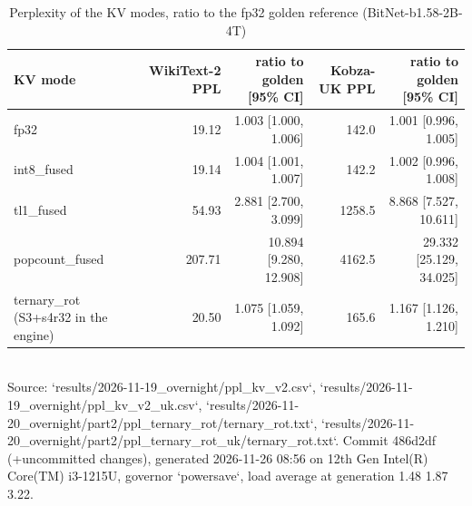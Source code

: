 \begin{table}[t]\centering\small
\caption{Perplexity of the KV modes, ratio to the fp32 golden reference (BitNet-b1.58-2B-4T)}
\begin{tabular}{lrrrr}\toprule
KV mode & WikiText-2 PPL & ratio to golden [95\% CI] & Kobza-UK PPL & ratio to golden [95\% CI] \\ \midrule
fp32 & 19.12 & 1.003 [1.000, 1.006] & 142.0 & 1.001 [0.996, 1.005] \\
int8\_fused & 19.14 & 1.004 [1.001, 1.007] & 142.2 & 1.002 [0.996, 1.008] \\
tl1\_fused & 54.93 & 2.881 [2.700, 3.099] & 1258.5 & 8.868 [7.527, 10.611] \\
popcount\_fused & 207.71 & 10.894 [9.280, 12.908] & 4162.5 & 29.332 [25.129, 34.025] \\
ternary\_rot (S3+s4r32 in the engine) & 20.50 & 1.075 [1.059, 1.092] & 165.6 & 1.167 [1.126, 1.210] \\
\bottomrule\end{tabular}
\\[2pt]{\scriptsize Source: `results/2026-11-19\_overnight/ppl\_kv\_v2.csv`, `results/2026-11-19\_overnight/ppl\_kv\_v2\_uk.csv`, `results/2026-11-20\_overnight/part2/ppl\_ternary\_rot/ternary\_rot.txt`, `results/2026-11-20\_overnight/part2/ppl\_ternary\_rot\_uk/ternary\_rot.txt`. Commit 486d2df (+uncommitted changes), generated 2026-11-26 08:56 on 12th Gen Intel(R) Core(TM) i3-1215U, governor `powersave`, load average at generation 1.48 1.87 3.22.}
\end{table}

